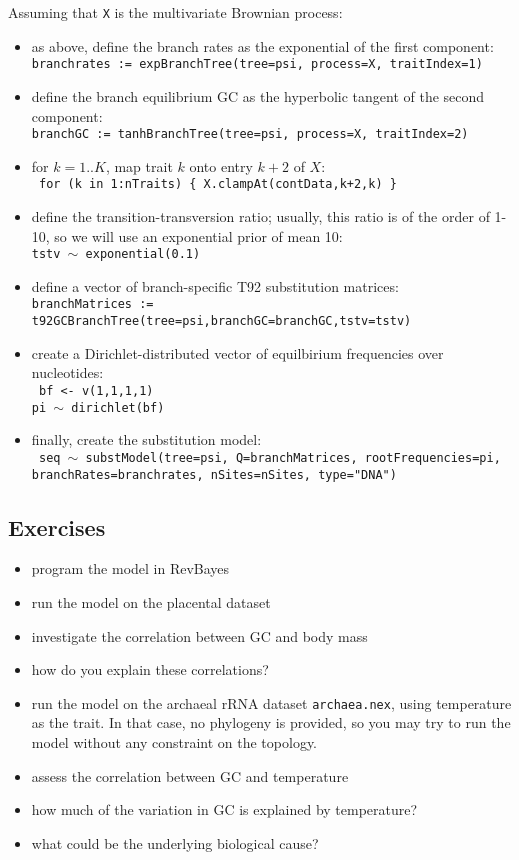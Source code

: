 \documentclass[usletter]{article}
\newcommand{\cmd}[1]{\texttt{#1}}
\begin{document}
Assuming that \cmd{X} is the multivariate Brownian process:
\begin{itemize}
\item
as above, define the branch rates as the exponential of the first component:
\\
\cmd{branchrates := expBranchTree(tree=psi, process=X, traitIndex=1)}
\item
define the branch equilibrium GC as the hyperbolic tangent of the second component:
\\
\cmd{branchGC := tanhBranchTree(tree=psi, process=X, traitIndex=2)}
\item
for $k=1..K$, map trait $k$ onto entry $k+2$ of $X$:
\\
\cmd{
for (k in 1:nTraits)    \{
        X.clampAt(contData,k+2,k)
\}
}
\item
define the transition-transversion ratio; usually, this ratio is of the order of 1-10, so we will use an exponential prior of mean 10:
\\
\cmd{tstv $\sim$ exponential(0.1)}
\item
define a vector of branch-specific T92 substitution matrices:
\\
\cmd{branchMatrices := t92GCBranchTree(tree=psi,branchGC=branchGC,tstv=tstv)}
\item
create a Dirichlet-distributed vector of equilbirium frequencies over nucleotides:
\\
\cmd{
bf <- v(1,1,1,1)
\\
pi $\sim$ dirichlet(bf)
}
\item
finally, create the substitution model:
\\
\cmd{
seq $\sim$ substModel(tree=psi, Q=branchMatrices, rootFrequencies=pi,
\\
branchRates=branchrates, nSites=nSites, type="DNA")
}
\end{itemize}

\subsection*{Exercises}

\begin{itemize}
\item
program the model in RevBayes
\item
run the model on the placental dataset
\item
investigate the correlation between GC and body mass
\item
how do you explain these correlations?
\item
run the model on the archaeal rRNA dataset \cmd{archaea.nex}, using temperature as the trait. In that case, no phylogeny is provided, so you may try to run the model without any constraint on the topology.
\item
assess the correlation between GC and temperature
\item
how much of the variation in GC is explained by temperature?
\item
what could be the underlying biological cause?
\end{itemize}
\end{document}
